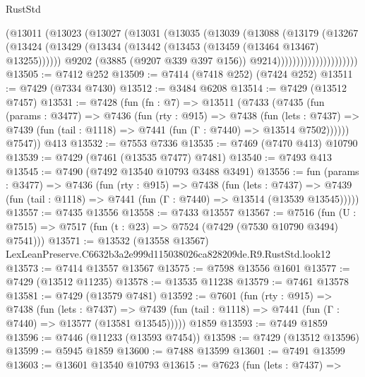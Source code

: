 \begin{lexlean}{RustStd}
\begin{coremodule}
                            (@13011
                              (@13023
                                (@13027
                                  (@13031
                                    (@13035
                                      (@13039
                                        (@13088
                                          (@13179
                                            (@13267
                                              (@13424
                                                (@13429
                                                  (@13434
                                                    (@13442
                                                      (@13453 (@13459 (@13464 @13467) @13255))))))
                                              @9202
                                              (@3885 (@9207 @339 @397 @156))
                                              @9214)))))))))))))))))))))
@13505 := @7412 @252
@13509 := @7414 (@7418 @252) (@7424 @252)
@13511 := @7429 (@7334 @7430)
@13512 := @3484 @6208
@13514 := @7429 (@13512 @7457)
@13531 := @7428
    (fun (fn : @7) =>
    @13511
      (@7433
        (@7435
          (fun (params : @3477) =>
          @7436
            (fun (rty : @915) =>
            @7438
              (fun (lets : @7437) =>
              @7439 (fun (tail : @1118) => @7441 (fun (Γ : @7440) => @13514 @7502))))))
        @7547))
    @413
@13532 := @7553 @7336
@13535 := @7469 (@7470 @413) @10790
@13539 := @7429 (@7461 (@13535 @7477) @7481)
@13540 := @7493 @413
@13545 := @7490 (@7492 @13540 @10793 @3488 @3491)
@13556 := fun (params : @3477) =>
  @7436
    (fun (rty : @915) =>
    @7438
      (fun (lets : @7437) =>
      @7439 (fun (tail : @1118) => @7441 (fun (Γ : @7440) => @13514 (@13539 @13545)))))
@13557 := @7435 @13556
@13558 := @7433 @13557
@13567 := @7516
    (fun (U : @7515) => @7517 (fun (t : @23) => @7524 (@7429 (@7530 @10790 @3494) @7541)))
@13571 := @13532 (@13558 @13567) LexLeanPreserve.C6632b3a2e999d115038026ca828209de.R9.RustStd.look12
@13573 := @7414 @13557 @13567
@13575 := @7598 @13556 @1601
@13577 := @7429 (@13512 @11235)
@13578 := @13535 @11238
@13579 := @7461 @13578
@13581 := @7429 (@13579 @7481)
@13592 := @7601
    (fun (rty : @915) =>
    @7438
      (fun (lets : @7437) =>
      @7439 (fun (tail : @1118) => @7441 (fun (Γ : @7440) => @13577 (@13581 @13545)))))
    @1859
@13593 := @7449 @1859
@13596 := @7446 (@11233 (@13593 @7454))
@13598 := @7429 (@13512 @13596)
@13599 := @5945 @1859
@13600 := @7488 @13599
@13601 := @7491 @13599
@13603 := @13601 @13540 @10793
@13615 := @7623
    (fun (lets : @7437) =>

\end{coremodule}
\end{lexlean}
